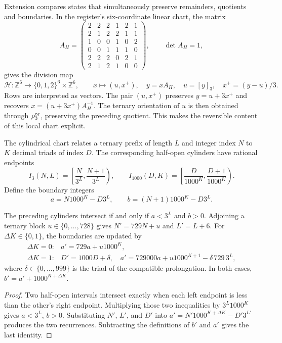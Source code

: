 Extension compares states that simultaneously preserve remainders, quotients and boundaries. In the register's six-coordinate linear chart, the matrix
\[
 A_H=\begin{pmatrix}
 2&2&2&1&2&1\\2&1&2&2&1&1\\1&0&0&1&0&2\\
 0&0&1&1&1&0\\2&2&2&0&2&1\\2&1&2&1&0&0
 \end{pmatrix},\qquad\det A_H=1,
\]
gives the division map
\begin{equation}
 \mathcal H:\mathbb Z^6\longrightarrow
 \{0,1,2\}^6\times\mathbb Z^6,\qquad
 x\longmapsto(u,x^+),\quad
 y=xA_H,\quad u=[y]_3,\quad x^+=(y-u)/3.
 \label{ii:ii:tpk-hensel-local}
\end{equation}
Rows are interpreted as vectors. The pair \((u,x^+)\) preserves \(y=u+3x^+\) and recovers \(x=(u+3x^+)A_H^{-1}\). The ternary orientation of \(u\) is then obtained through \(\rho_3^{\rm or}\), preserving the preceding quotient. This makes the reversible content of this local chart explicit.

The cylindrical chart relates a ternary prefix of length \(L\) and integer index \(N\) to \(K\) decimal triads of index \(D\). The corresponding half-open cylinders have rational endpoints
\[
 I_3(N,L)=\left[\frac N{3^L},\frac{N+1}{3^L}\right),\qquad
 I_{1000}(D,K)=\left[\frac D{1000^K},\frac{D+1}{1000^K}\right).
\]
Define the boundary integers
\[
 a=N1000^K-D3^L,\qquad b=(N+1)1000^K-D3^L.
\]

\begin{lemma}
\label{ii:ii:tpk-cilindros-enteros}
The preceding cylinders intersect if and only if
\(a<3^L\) and \(b>0\). Adjoining a ternary block
\(u\in\{0,\ldots,728\}\) gives \(N'=729N+u\) and
\(L'=L+6\). For \(\Delta K\in\{0,1\}\), the boundaries are
updated by
\[
 \begin{array}{ll}
 \Delta K=0:&a'=729a+u1000^K,\\[2pt]
 \Delta K=1:&D'=1000D+\delta,\quad
 a'=729000a+u1000^{K+1}-\delta\,729\,3^L,
 \end{array}
\]
where \(\delta\in\{0,\ldots,999\}\) is the triad of the
compatible prolongation. In both cases,
\(b'=a'+1000^{K+\Delta K}\).
\end{lemma}
\begin{proof}
Two half-open intervals intersect exactly when each left
endpoint is less than the other's right endpoint. Multiplying those two
inequalities by \(3^L1000^K\) gives \(a<3^L\), \(b>0\).
Substituting \(N'\), \(L'\), and \(D'\) into
\(a'=N'1000^{K+\Delta K}-D'3^{L'}\) produces the two recurrences.
Subtracting the definitions of \(b'\) and \(a'\) gives the last identity.
\end{proof}

